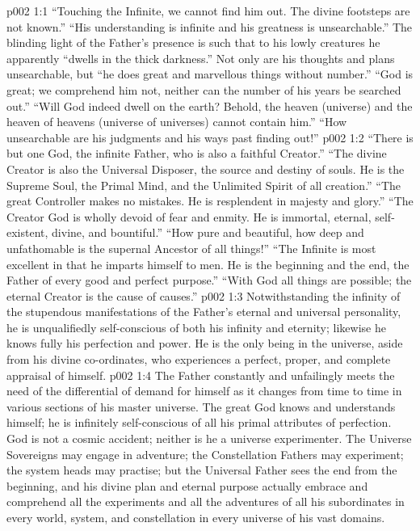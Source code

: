 \vs p002 1:1 “Touching the Infinite, we cannot find him out. The divine footsteps are not known.” “His understanding is infinite and his greatness is unsearchable.” The blinding light of the Father’s presence is such that to his lowly creatures he apparently “dwells in the thick darkness.” Not only are his thoughts and plans unsearchable, but “he does great and marvellous things without number.” “God is great; we comprehend him not, neither can the number of his years be searched out.” “Will God indeed dwell on the earth? Behold, the heaven (universe) and the heaven of heavens (universe of universes) cannot contain him.” “How unsearchable are his judgments and his ways past finding out!”
\vs p002 1:2 “There is but one God, the infinite Father, who is also a faithful Creator.” “The divine Creator is also the Universal Disposer, the source and destiny of souls. He is the Supreme Soul, the Primal Mind, and the Unlimited Spirit of all creation.” “The great Controller makes no mistakes. He is resplendent in majesty and glory.” “The Creator God is wholly devoid of fear and enmity. He is immortal, eternal, self\hyp{}existent, divine, and bountiful.” “How pure and beautiful, how deep and unfathomable is the supernal Ancestor of all things!” “The Infinite is most excellent in that he imparts himself to men. He is the beginning and the end, the Father of every good and perfect purpose.” “With God all things are possible; the eternal Creator is the cause of causes.”
\vs p002 1:3 \pc Notwithstanding the infinity of the stupendous manifestations of the Father’s eternal and universal personality, he is unqualifiedly self\hyp{}conscious of both his infinity and eternity; likewise he knows fully his perfection and power. He is the only being in the universe, aside from his divine co\hyp{}ordinates, who experiences a perfect, proper, and complete appraisal of himself.
\vs p002 1:4 The Father constantly and unfailingly meets the need of the differential of demand for himself as it changes from time to time in various sections of his master universe. The great God knows and understands himself; he is infinitely self\hyp{}conscious of all his primal attributes of perfection. God is not a cosmic accident; neither is he a universe experimenter. The Universe Sovereigns may engage in adventure; the Constellation Fathers may experiment; the system heads may practise; but the Universal Father sees the end from the beginning, and his divine plan and eternal purpose actually embrace and comprehend all the experiments and all the adventures of all his subordinates in every world, system, and constellation in every universe of his vast domains.
